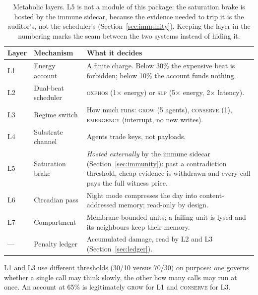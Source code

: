 \documentclass[conference]{IEEEtran}
\begin{document}
\begin{table}[t]
  \centering
  \caption{Metabolic layers. L5 is not a module of this package: the saturation
  brake is hosted by the immune sidecar, because the evidence needed to trip it
  is the auditor's, not the scheduler's (Section~\ref{sec:immunity}). Keeping the
  layer in the numbering marks the seam between the two systems instead of
  hiding it.}
  \label{tab:layers}
  \renewcommand{\arraystretch}{1.12}
  \setlength{\tabcolsep}{4pt}
  \begin{tabular}{@{}L{0.12\columnwidth}L{0.30\columnwidth}L{0.50\columnwidth}@{}}
    \toprule
    \textbf{Layer} & \textbf{Mechanism} & \textbf{What it decides} \\
    \midrule
    L1 & Energy account      & A finite charge. Below 30\% the expensive beat is
                                 forbidden; below 10\% the account funds nothing. \\
    L2 & Dual-beat scheduler & \textsc{oxphos} (1$\times$ energy) or \textsc{slp}
                                 (5$\times$ energy, 2$\times$ latency). \\
    L3 & Regime switch       & How much runs: \textsc{grow} (5 agents),
                                 \textsc{conserve} (1), \textsc{emergency}
                                 (interrupt, no new writes). \\
    L4 & Substrate channel   & Agents trade keys, not payloads. \\
    L5 & Saturation brake    & \emph{Hosted externally} by the immune sidecar
                                 (Section~\ref{sec:immunity}): past a contradiction
                                 threshold, cheap evidence is withdrawn and every
                                 call pays the full witness price. \\
    L6 & Circadian pass      & Night mode compresses the day into
                                 content-addressed memory; read-only by design. \\
    L7 & Compartment         & Membrane-bounded units; a failing unit is lysed and
                                 its neighbours keep their memory. \\
    \midrule
    --- & Penalty ledger     & Accumulated damage, read by L2 and L3 (Section~\ref{sec:ledger}). \\
    \bottomrule
  \end{tabular}
\end{table}

L1 and L3 use different thresholds (30/10 versus 70/30) on purpose: one governs
whether a single call may think slowly, the other how many calls may run at once.
An account at 65\% is legitimately \textsc{grow} for L1 and \textsc{conserve} for
L3.
\end{document}
